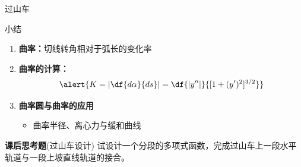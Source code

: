 \begin{frame}{过山车}
	\linespread{1.2}
	\vspace{-1ex}
	\begin{center}
		\hspace{1em}
	\end{center}
\end{frame}

\begin{frame}{小结}
	\linespread{1.2}
	\begin{enumerate}
	  \item {\bf 曲率：}切线转角相对于弧长的变化率
	  \item {\bf 曲率的计算：}
	  $$\alert{K=\left|\df{d\alpha}{ds}\right|
				=\df{|y''|}{[1+(y')^2]^{3/2}}}$$
	  \item {\bf 曲率圆与曲率的应用}
	  \begin{itemize}
	    \item 曲率半径、离心力与缓和曲线
	  \end{itemize}
	\end{enumerate}
	\pause
	\begin{exampleblock}{{\bf 课后思考题}(过山车设计)\hfill}
		试设计一个分段的多项式函数，完成过山车上一段水平轨道与一段上坡直线轨道的接合。
	\end{exampleblock}
\end{frame}
